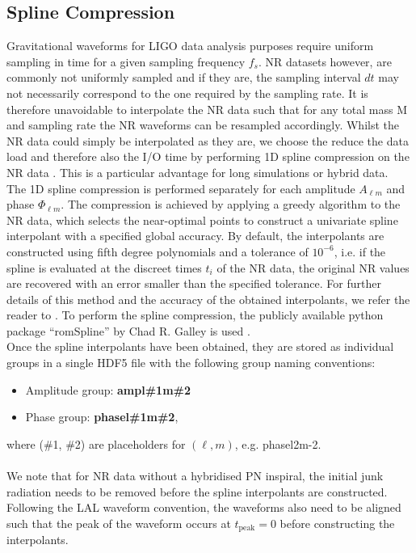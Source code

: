 \documentclass[a4paper, 11pt]{article}
\begin{document}
\subsection{Spline Compression}
\label{sec:spline}
Gravitational waveforms for LIGO data analysis purposes require uniform sampling in time for a given sampling frequency $f_s$.
NR datasets however, are commonly not uniformly sampled and if they are, the sampling interval $dt$ may not necessarily
correspond to the one required by the sampling rate. It is therefore unavoidable to interpolate the NR data such that for any total
mass M and sampling rate the NR waveforms can be resampled accordingly. Whilst the NR data could simply be interpolated as
they are, we choose the reduce the data load and therefore also the I/O time by performing 1D spline compression on the NR data
\cite{}. This is a particular advantage for long simulations or hybrid data. \\

The 1D spline compression is performed separately for each amplitude $A_{\ell m}$ and phase $\Phi_{\ell m}$. The compression is
achieved by applying a greedy algorithm to the NR data, which selects the near-optimal points to construct a univariate spline interpolant
with a specified global accuracy. By default, the interpolants are constructed using fifth degree polynomials and a tolerance of $10^{-6}$,
i.e. if the spline is evaluated at the discreet times $t_i$ of the NR data, the original NR values are recovered with an error smaller than the
specified tolerance. For further details of this method and the accuracy of the obtained interpolants, we refer the reader to \cite{}. 
To perform the spline compression, the publicly available python package ``romSpline'' by Chad R. Galley is used \cite{}. \\

Once the spline interpolants have been obtained, they are stored as individual groups in a single HDF5 file with the following group naming
conventions: 
\begin{itemize}
  \item Amplitude group: \textbf{amp\textunderscore l\#1\textunderscore m\#2}
  \item Phase group: \textbf{phase\textunderscore  l\#1\textunderscore m\#2},
\end{itemize}
where (\#1, \#2) are placeholders for $(\ell, m)$, e.g. phase\textunderscore l2\textunderscore m-2. \\
\\We note that for NR data without a hybridised PN inspiral, the initial junk radiation needs to be removed before the spline interpolants are constructed. 
Following the LAL waveform convention, the waveforms also need to be aligned such that the peak of the waveform occurs at $t_\mathrm{peak}=0$ 
before constructing the interpolants.
\end{document}
